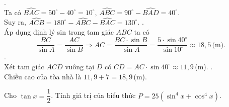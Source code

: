 \begin{ex}
{\begin{center}
\begin{tikzpicture}[line join=round, line cap=round, >=stealth, font=\footnotesize, scale=1]
\end{tikzpicture}
\end{center}
\begin{itemchoice}
.\\
Ta có $\widehat{BAC}=50^{\circ}-40^{\circ}=10^{\circ}$,
$\widehat{ABC}=90^{\circ}-\widehat{BAD}=40^{\circ}$.\\
Suy ra, $\widehat{ACB}=180^{\circ}-\widehat{ABC}-\widehat{BAC}=130^{\circ}$.
.\\
Áp dụng định lý sin trong tam giác $ABC$ ta có
\[
\dfrac{BC}{\sin A}=\dfrac{AC}{\sin B}\Rightarrow AC=\dfrac{BC \cdot \sin B}{\sin A}=\dfrac{5 \cdot \sin 40^{\circ}}{\sin 10^{\circ}}\approx 18{,}5\,\text{(m).}
\]
.\\
Xét tam giác $ACD$ vuông tại $D$ có $CD=AC \cdot \sin 40^{\circ}\approx 11{,}9$\,(m).
.\\
Chiều cao của tòa nhà là $11{,}9+7=18{,}9$\,(m).
\end{itemchoice}
}
\end{ex}

\TNSA
\begin{ex}%
Cho $\tan x=\dfrac{1}{2}$. Tính giá trị của biểu thức $P=25\left(\sin^4x+\cos^4x\right)$.
\end{ex}

